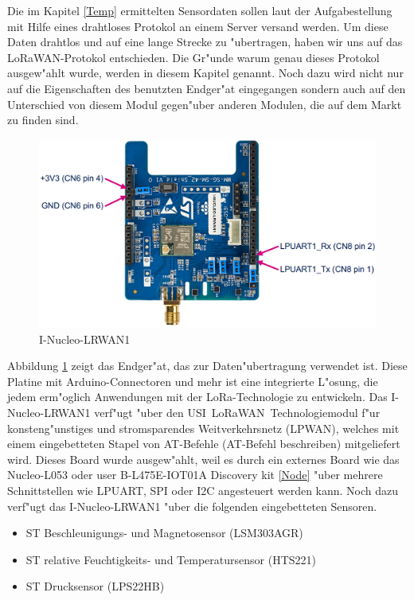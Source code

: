 Die im Kapitel \ref{Temp} ermittelten Sensordaten sollen laut der 
Aufgabestellung mit Hilfe eines drahtloses Protokol an einem Server 
versand werden. Um diese Daten drahtlos und auf eine lange Strecke zu 
"ubertragen, haben wir uns auf das LoRaWAN-Protokol entschieden. Die 
Gr"unde warum genau dieses Protokol ausgew"ahlt wurde, werden in diesem 
Kapitel genannt. Noch dazu wird nicht nur auf die Eigenschaften des 
benutzten Endger"at eingegangen sondern auch auf den Unterschied von 
diesem Modul gegen"uber anderen Modulen, die auf dem Markt zu finden 
sind.   
 
 
\begin{figure}[h]
	\centering
	\includegraphics[width=14cm]{source/images/LoRa_mod}
	\caption{I-Nucleo-LRWAN1 \cite{LoRaMod}\label{fig:loraMod}}
\end{figure}

Abbildung \ref{fig:loraMod} zeigt das Endger"at, das zur 
Daten"ubertragung verwendet ist. Diese Platine mit Arduino-Connectoren 
und mehr ist eine integrierte L"osung, die jedem erm"oglich Anwendungen 
mit der LoRa-Technologie zu entwickeln. Das I-Nucleo-LRWAN1 verf"ugt 
"uber den USI\textregistered\ LoRaWAN\texttrademark\ Technologiemodul 
f"ur konsteng"unstiges und stromsparendes Weitverkehrsnetz (LPWAN), 
welches mit einem eingebetteten Stapel von AT-Befehle (AT-Befehl 
beschreiben) mitgeliefert wird.
Dieses Board wurde ausgew"ahlt, weil es durch ein externes Board wie 
das Nucleo-L053 oder user B-L475E-IOT01A Discovery kit \ref{Node} "uber 
mehrere Schnittstellen wie LPUART, SPI oder I2C angesteuert werden 
kann. Noch dazu verf"ugt das I-Nucleo-LRWAN1 "uber die folgenden 
eingebetteten Sensoren.

\begin{itemize}
	\item ST Beschleunigungs- und Magnetosensor (LSM303AGR)
	\item ST relative Feuchtigkeits- und Temperatursensor (HTS221)
	\item ST Drucksensor (LPS22HB)
\end{itemize}

